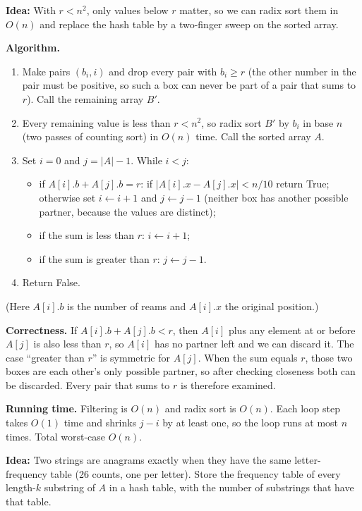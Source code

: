 \documentclass[12pt,twoside]{article}
\begin{document}
\begin{problems}
\begin{problemparts}
\problempart %
\textbf{Idea:} With $r<n^2$, only values below $r$ matter, so we can radix sort them in $O(n)$ and
replace the hash table by a two-finger sweep on the sorted array.

\textbf{Algorithm.}
\begin{enumerate}
\item Make pairs $(b_i,i)$ and drop every pair with $b_i\ge r$ (the other number in the pair
must be positive, so such a box can never be part of a pair that sums to $r$). Call the remaining
array $B'$.
\item Every remaining value is less than $r<n^2$, so radix sort $B'$ by $b_i$ in base $n$
(two passes of counting sort) in $O(n)$ time. Call the sorted array $A$.
\item Set $i=0$ and $j=|A|-1$. While $i<j$:
\begin{itemize}
\item if $A[i].b+A[j].b=r$: if $|A[i].x-A[j].x|<n/10$ return True; otherwise set $i\gets i+1$ and
$j\gets j-1$ (neither box has another possible partner, because the values are distinct);
\item if the sum is less than $r$: $i\gets i+1$;
\item if the sum is greater than $r$: $j\gets j-1$.
\end{itemize}
\item Return False.
\end{enumerate}
(Here $A[i].b$ is the number of reams and $A[i].x$ the original position.)

\textbf{Correctness.} If $A[i].b+A[j].b<r$, then $A[i]$ plus any element at or before $A[j]$ is also
less than $r$, so $A[i]$ has no partner left and we can discard it. The case ``greater than $r$'' is
symmetric for $A[j]$. When the sum equals $r$, those two boxes are each other's only possible partner,
so after checking closeness both can be discarded. Every pair that sums to $r$ is therefore examined.

\textbf{Running time.} Filtering is $O(n)$ and radix sort is $O(n)$. Each loop step takes $O(1)$ time
and shrinks $j-i$ by at least one, so the loop runs at most $n$ times. Total worst-case $O(n)$.
\end{problemparts}

\newpage

\problem  %

\begin{problemparts}
\problempart %
\textbf{Idea:} Two strings are anagrams exactly when they have the same letter-frequency table
(26 counts, one per letter). Store the frequency table of every length-$k$ substring of $A$ in
a hash table, with the number of substrings that have that table.


\end{problemparts}
\end{problems}
\end{document}
